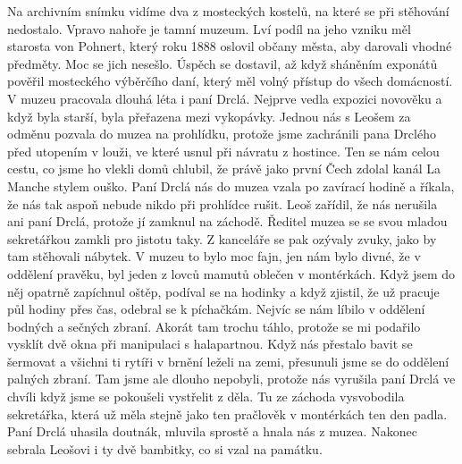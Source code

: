 
Na archivním snímku vidíme dva z mosteckých kostelů, na které se při
stěhování nedostalo. Vpravo nahoře je tamní muzeum. Lví podíl na jeho
vzniku měl starosta von Pohnert, který roku 1888 oslovil občany města,
aby darovali vhodné předměty. Moc se jich nesešlo. Úspěch se dostavil,
až když sháněním exponátů pověřil mosteckého výběrčího daní, který měl
volný přístup do všech domácností. V muzeu pracovala dlouhá léta i
paní Drclá. Nejprve vedla expozici novověku a když byla starší, byla
přeřazena mezi vykopávky. Jednou nás s Leošem za odměnu pozvala do
muzea na prohlídku, protože jsme zachránili pana Drclého před utopením
v louži, ve které usnul při návratu z hostince. Ten se nám celou
cestu, co jsme ho vlekli domů chlubil, že právě jako první Čech zdolal
kanál La Manche stylem ouško. Paní Drclá nás do muzea vzala po
zavírací hodině a říkala, že nás tak aspoň nebude nikdo při prohlídce
rušit. Leoš zařídil, že nás nerušila ani paní Drclá, protože jí
zamknul na záchodě. Ředitel muzea se se svou mladou sekretářkou zamkli
pro jistotu taky. Z kanceláře se pak ozývaly zvuky, jako by tam
stěhovali nábytek. V muzeu to bylo moc fajn, jen nám bylo divné, že v
oddělení pravěku, byl jeden z lovců mamutů oblečen v montérkách. Když
jsem do něj opatrně zapíchnul oštěp, podíval se na hodinky a když
zjistil, že už pracuje půl hodiny přes čas, odebral se k píchačkám.
Nejvíc se nám líbilo v oddělení bodných a sečných zbraní. Akorát tam
trochu táhlo, protože se mi podařilo vysklít dvě okna při manipulaci s
halapartnou. Když nás přestalo bavit se šermovat a všichni ti rytíři v
brnění leželi na zemi, přesunuli jsme se do oddělení palných zbraní.
Tam jsme ale dlouho nepobyli, protože nás vyrušila paní Drclá ve
chvíli když jsme se pokoušeli vystřelit z děla. Tu ze záchoda
vysvobodila sekretářka, která už měla stejně jako ten pračlověk v
montérkách ten den padla. Paní Drclá uhasila doutnák, mluvila sprostě
a hnala nás z muzea. Nakonec sebrala Leošovi i ty dvě bambitky, co si
vzal na památku.
